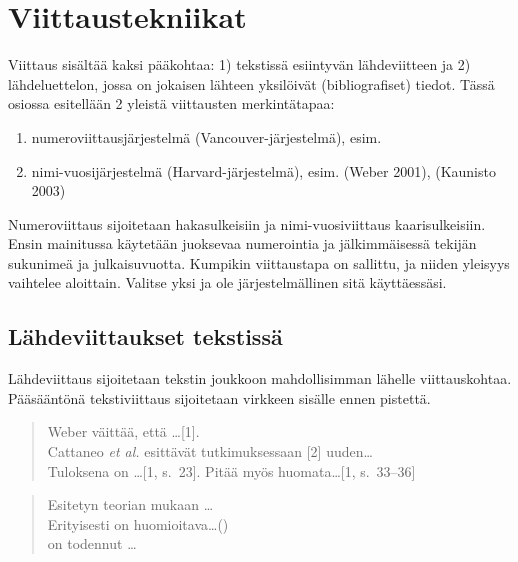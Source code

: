 \documentclass[globalnumbering,centeredcaptions,draftfooter]{tutthesis/tutthesis} %
\newif\ifnameyear
\begin{document}
\chapter{Viittaustekniikat}
\label{ch:viittaustekniikat}

Viittaus sisältää kaksi pääkohtaa: 1) tekstissä esiintyvän lähdeviitteen ja 2) lähdeluettelon, jossa on jokaisen lähteen yksilöivät (bibliografiset) tiedot.
Tässä osiossa esitellään 2 yleistä viittausten merkintätapaa:
\begin{enumerate}
\ifnameyear
  \item numeroviittausjärjestelmä (Vancouver-järjestelmä), esim. [1], [2]\ldots
  \item nimi-vuosijärjestelmä (Harvard-järjestelmä), esim. \citep{Weber2001}, \citep{Kaunisto2003}
\else
  \item numeroviittausjärjestelmä (Vancouver-järjestelmä), esim. \cite{Weber2001}\cite{Kaunisto2003}
  \item nimi-vuosijärjestelmä (Harvard-järjestelmä), esim. (Weber 2001), (Kaunisto 2003)
\fi
\end{enumerate}

Numeroviittaus sijoitetaan hakasulkeisiin ja nimi-vuosiviittaus kaarisulkeisiin.
Ensin mainitussa käytetään juoksevaa numerointia ja jälkimmäisessä tekijän sukunimeä ja julkaisuvuotta.
Kumpikin viittaustapa on sallittu, ja niiden yleisyys vaihtelee aloittain.
Valitse yksi ja ole järjestelmällinen sitä käyttäessäsi.


\section{Lähdeviittaukset tekstissä}

Lähdeviittaus sijoitetaan tekstin joukkoon mahdollisimman lähelle viittauskohtaa.
Pääsääntönä tekstiviittaus sijoitetaan virkkeen sisälle ennen pistettä.

\ifnameyear
  \begin{quotation}
  Weber väittää, että \ldots [1].\\
  Cattaneo \emph{et al.} esittävät tutkimuksessaan [2] uuden\ldots\\
  Tuloksena on \ldots [1, s.~23]. Pitää myös huomata\ldots [1, s.~33--36]
  \end{quotation}

  \begin{quotation}
  Esitetyn teorian mukaan \ldots \citep{Weber2001}\\
  Erityisesti on huomioitava\ldots (\citeauthor{Cattaneo2004})\\
  \citet[s.~230]{Weber2001} on todennut \ldots
  \end{quotation}
    
\end{document}
